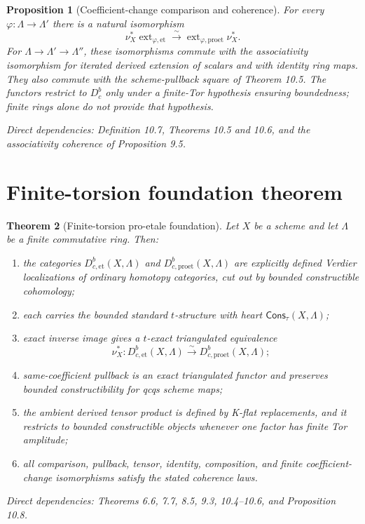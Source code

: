 \documentclass[10pt]{article}
\newtheorem{theorem}{Theorem}[section]
\newtheorem{proposition}[theorem]{Proposition}
\theoremstyle{definition}
\newcommand{\Lam}{\Lambda}
\newcommand{\Cons}{\mathsf{Cons}}
\newcommand{\et}{\mathrm{et}}
\newcommand{\proet}{\mathrm{proet}}
\newcommand{\Dbc}{D^b_c}
\newcommand{\DbcAt}[1]{D^b_{c,#1}}
\newcommand{\dep}[1]{\par\smallskip\noindent\textit{Direct dependencies: #1}}
\begin{document}
\begin{proposition}[Coefficient-change comparison and coherence]
For every $\varphi:\Lam\to\Lam'$ there is a natural isomorphism
\[
\nu_X^*\operatorname{ext}_{\varphi,\et}
\xrightarrow{\sim}
\operatorname{ext}_{\varphi,\proet}\nu_X^*.
\]
For $\Lam\to\Lam'\to\Lam''$, these isomorphisms commute with the associativity
isomorphism for iterated derived extension of scalars and with identity ring
maps.  They also commute with the scheme-pullback square of Theorem 10.5.
The functors restrict to $\Dbc$ only under a finite-Tor hypothesis ensuring
boundedness; finite rings alone do not provide that hypothesis.
\dep{Definition 10.7, Theorems 10.5 and 10.6, and the associativity coherence
of Proposition 9.5.}
\end{proposition}

\section{Finite-torsion foundation theorem}

\begin{theorem}[Finite-torsion pro-etale foundation]
Let $X$ be a scheme and let $\Lam$ be a finite commutative ring.  Then:
\begin{enumerate}
\item the categories $\DbcAt{\et}(X,\Lam)$ and
$\DbcAt{\proet}(X,\Lam)$ are explicitly defined Verdier localizations of
ordinary homotopy categories, cut out by bounded constructible cohomology;
\item each carries the bounded standard $t$-structure with heart
$\Cons_\tau(X,\Lam)$;
\item exact inverse image gives a $t$-exact triangulated equivalence
\[
\nu_X^*: \DbcAt{\et}(X,\Lam)\xrightarrow{\sim}
\DbcAt{\proet}(X,\Lam);
\]
\item same-coefficient pullback is an exact triangulated functor and preserves
bounded constructibility for qcqs scheme maps;
\item the ambient derived tensor product is defined by K-flat replacements,
and it restricts to bounded constructible objects whenever one factor has
finite Tor amplitude;
\item all comparison, pullback, tensor, identity, composition, and finite
coefficient-change isomorphisms satisfy the stated coherence laws.
\end{enumerate}
\dep{Theorems 6.6, 7.7, 8.5, 9.3, 10.4--10.6, and Proposition 10.8.}
\end{theorem}
\end{document}

